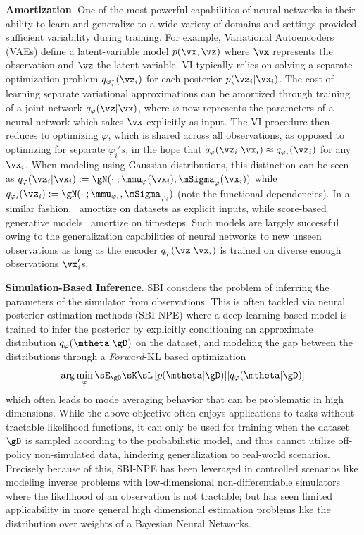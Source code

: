 \textbf{Amortization}. One of the most powerful capabilities of neural networks is their ability to learn and generalize to a wide variety of domains and settings provided sufficient variability during training. For example, Variational Autoencoders (VAEs) define a latent-variable model $p(\vx, \vz)$ where $\vx$ represents the observation and $\vz$ the latent variable. VI typically relies on solving a separate optimization problem $q_{\varphi_i^*}(\vz_i)$ for each posterior $p(\vz_i | \vx_i)$. The cost of learning separate variational approximations can be amortized through training of a joint network $q_\varphi(\vz | \vx)$, where $\varphi$ now represents the parameters of a neural network which takes $\vx$ explicitly as input. The VI procedure then reduces to optimizing $\varphi$, which is shared across all observations, as opposed to optimizing for separate $\varphi_i's$, in the hope that $q_\varphi(\vz_i | \vx_i) \approx q_{\varphi_i}(\vz_i)$ for any $\vx_i$. When modeling using Gaussian distributions, this distinction can be seen as $q_\varphi(\vz_i | \vx_i) := \gN(\cdot\;; \mmu_\varphi(\vx_i), \mSigma_\varphi(\vx_i))$ while $q_{\varphi_i}(\vz_i) := \gN(\cdot\;; \mmu_{\varphi_i}, \mSigma_{\varphi_i})$ (note the functional dependencies). In a similar fashion,~\citet{garnelo2018neural} amortize on datasets as explicit inputs, while score-based generative models~\citep{song2020score} amortize on timesteps. Such models are largely successful owing to the generalization capabilities of neural networks to new unseen observations as long as the encoder $q_\varphi(\vz | \vx_i)$ is trained on diverse enough observations $\vx_i'$s.

\textbf{Simulation-Based Inference}. SBI considers the problem of inferring the parameters of the simulator from observations. This is often tackled via neural posterior estimation methods (SBI-NPE) where a deep-learning based model is trained to infer the posterior by explicitly conditioning an approximate distribution $q_\varphi(\mtheta | \gD)$ on the dataset, and modeling the gap between the distributions through a {\it Forward}-KL based optimization
\begin{align}
    \label{eq:sbi}
    \arg\min_\varphi \sE_{\gD}\sK\sL \left[p(\mtheta | \gD) || q_\varphi(\mtheta | \gD)\right]
\end{align}
which often leads to mode averaging behavior that can be problematic in high dimensions. While the above objective often enjoys applications to tasks without tractable likelihood functions, it can only be used for training when the dataset $\gD$ is sampled according to the probabilistic model, and thus cannot utilize off-policy non-simulated data, hindering generalization to real-world scenarios. Precisely because of this, SBI-NPE has been leveraged in controlled scenarios like modeling inverse problems with low-dimensional non-differentiable simulators where the likelihood of an observation is not tractable; but has seen limited applicability in more general high dimensional estimation problems like the distribution over weights of a Bayesian Neural Networks. 

